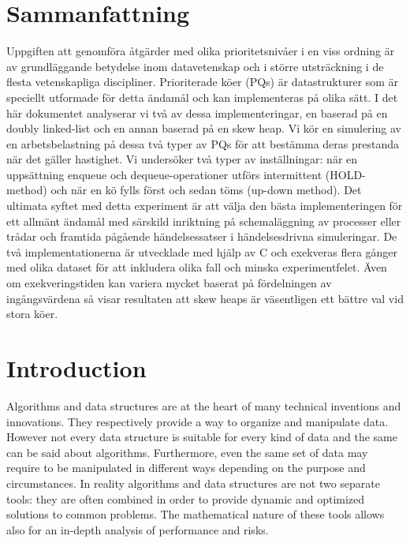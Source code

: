 \documentclass{article}
\begin{document}
\section*{Sammanfattning}
Uppgiften att genomföra åtgärder med olika prioritetsnivåer i en viss ordning är av grundläggande betydelse inom datavetenskap och i större utsträckning i de flesta vetenskapliga discipliner. Prioriterade köer (PQs) är datastrukturer som är speciellt utformade för detta ändamål och kan implementeras på olika sätt. I det här dokumentet analyserar vi två av dessa implementeringar, en baserad på en doubly linked-list och en annan baserad på en skew heap. Vi kör en simulering av en arbetsbelastning på dessa två typer av PQs för att bestämma deras prestanda när det gäller hastighet. Vi undersöker två typer av inställningar: när en uppsättning enqueue och dequeue-operationer utförs intermittent (HOLD-method) och när en kö fylls först och sedan töms (up-down method). Det ultimata syftet med detta experiment är att välja den bästa implementeringen för ett allmänt ändamål med särskild inriktning på schemaläggning av processer eller trådar och framtida pågående händelsessatser i händelsesdrivna simuleringar. De två implementationerna är utvecklade med hjälp av C och exekveras flera gånger med olika dataset för att inkludera olika fall och minska experimentfelet. Även om exekveringstiden kan variera mycket baserat på fördelningen av ingångsvärdena så visar resultaten att skew heaps är väsentligen ett bättre val vid stora köer.

\pagebreak



\tableofcontents

\pagebreak



\section{Introduction}
Algorithms and data structures are at the heart of many technical inventions and innovations. They respectively provide a way to organize and manipulate data. However not every data structure is suitable for every kind of data and the same can be said about algorithms. Furthermore, even the same set of data may require to be manipulated in different ways depending on the purpose and circumstances. In reality algorithms and data structures are not two separate tools: they are often combined in order to provide dynamic and optimized solutions to common problems. The mathematical nature of these tools allows also for an in-depth analysis of performance and risks.
\end{document}
